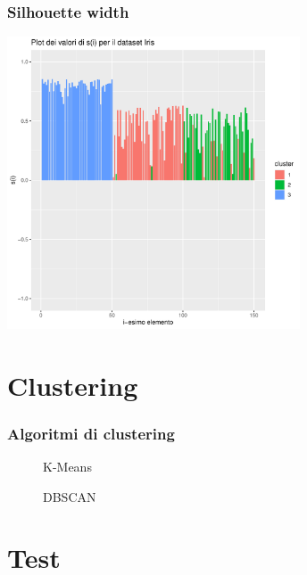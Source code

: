 \documentclass{beamer}
\begin{document}
        \begin{frame}
            \frametitle{Silhouette width}

            \centering
            \includegraphics[width = 0.65\textwidth]{doc/si.pdf}
        \end{frame}

    \section{Clustering}

        \begin{frame}
            \frametitle{Algoritmi di clustering}

            \centering
            \begin{boxedminipage}{0.49\textwidth}
                \begin{figure}
                
                \caption{K-Means}
                \end{figure}
            \end{boxedminipage}
            \begin{boxedminipage}{0.49\textwidth}
                \begin{figure}
                
                \caption{DBSCAN}
                \end{figure}
            \end{boxedminipage}
        \end{frame}

    \section{Test}
\end{document}
